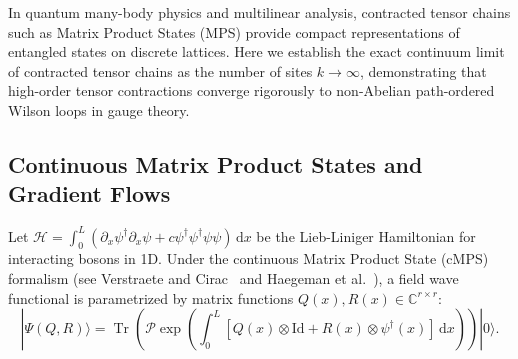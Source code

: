 \documentclass[11pt,a4paper,reqno]{amsart}
\theoremstyle{definition}
\numberwithin{equation}{section}
\newcommand{\C}{\mathbb{C}}
\newcommand{\Id}{\mathrm{Id}}
\newcommand{\Tr}{\operatorname{Tr}}
\newcommand{\dif}{\,\mathrm{d}}
\begin{document}
In quantum many-body physics and multilinear analysis, contracted tensor chains such as Matrix Product States (MPS) provide compact representations of entangled states on discrete lattices. Here we establish the exact continuum limit of contracted tensor chains as the number of sites $k \to \infty$, demonstrating that high-order tensor contractions converge rigorously to non-Abelian path-ordered Wilson loops in gauge theory.

\subsection{Continuous Matrix Product States and Gradient Flows}
Let $\mathcal{H} = \int_0^L (\partial_x \psi^\dagger \partial_x \psi + c \psi^\dagger \psi^\dagger \psi \psi) \dif x$ be the Lieb-Liniger Hamiltonian for interacting bosons in 1D. Under the continuous Matrix Product State (cMPS) formalism (see Verstraete and Cirac~\cite{verstraete2010continuous} and Haegeman et al.~\cite{haegeman2011tdvp}), a field wave functional is parametrized by matrix functions $Q(x), R(x) \in \C^{r \times r}$:
\begin{equation}
    \label{eq:cmps_state}
    |\Psi(Q, R)\rangle = \Tr\left( \mathcal{P} \exp\left( \int_0^L [Q(x) \otimes \Id + R(x) \otimes \psi^\dagger(x)] \dif x \right) \right) |0\rangle.
\end{equation}
\end{document}
